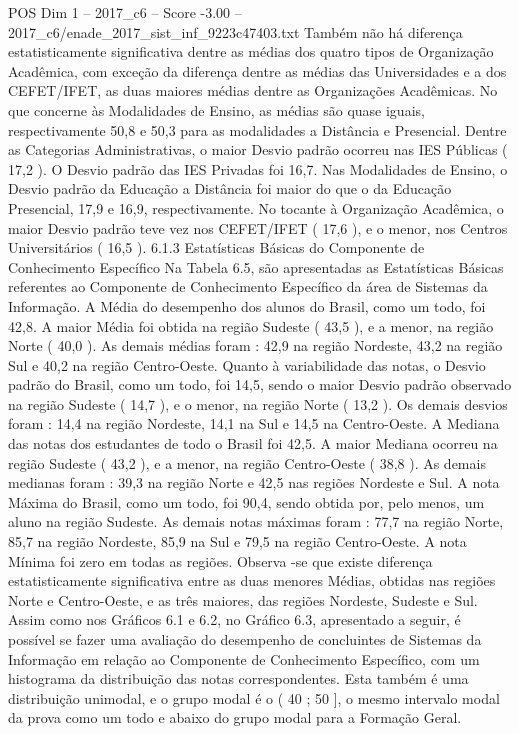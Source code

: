 \begin{textsample}{POS Dim 1 – 2017\_c6 – Score -3.00 – 2017\_c6/enade\_2017\_sist\_inf\_9223c47403.txt}
Também não há diferença estatisticamente significativa dentre as médias dos quatro tipos de Organização Acadêmica, com exceção da diferença dentre as médias das Universidades e a dos CEFET/IFET, as duas maiores médias dentre as Organizações Acadêmicas.
No que concerne às Modalidades de Ensino, as médias são quase iguais, respectivamente 50,8 e 50,3 para as modalidades a Distância e Presencial.
Dentre as Categorias Administrativas, o maior Desvio padrão ocorreu nas IES Públicas ( 17,2 ).
O Desvio padrão das IES Privadas foi 16,7.
Nas Modalidades de Ensino, o Desvio padrão da Educação a Distância foi maior do que o da Educação Presencial, 17,9 e 16,9, respectivamente.
No tocante à Organização Acadêmica, o maior Desvio padrão teve vez nos CEFET/IFET ( 17,6 ), e o menor, nos Centros Universitários ( 16,5 ). 6.1.3 Estatísticas Básicas do Componente de Conhecimento Específico Na Tabela 6.5, são apresentadas as Estatísticas Básicas referentes ao Componente de Conhecimento Específico da área de Sistemas da Informação.
A Média do desempenho dos alunos do Brasil, como um todo, foi 42,8.
A maior Média foi obtida na região Sudeste ( 43,5 ), e a menor, na região Norte ( 40,0 ).
As demais médias foram : 42,9 na região Nordeste, 43,2 na região Sul e 40,2 na região Centro-Oeste.
Quanto à variabilidade das notas, o Desvio padrão do Brasil, como um todo, foi 14,5, sendo o maior Desvio padrão observado na região Sudeste ( 14,7 ), e o menor, na região Norte ( 13,2 ).
Os demais desvios foram : 14,4 na região Nordeste, 14,1 na Sul e 14,5 na Centro-Oeste.
A Mediana das notas dos estudantes de todo o Brasil foi 42,5.
A maior Mediana ocorreu na região Sudeste ( 43,2 ), e a menor, na região Centro-Oeste ( 38,8 ).
As demais medianas foram : 39,3 na região Norte e 42,5 nas regiões Nordeste e Sul.
A nota Máxima do Brasil, como um todo, foi 90,4, sendo obtida por, pelo menos, um aluno na região Sudeste.
As demais notas máximas foram : 77,7 na região Norte, 85,7 na região Nordeste, 85,9 na Sul e 79,5 na região Centro-Oeste.
A nota Mínima foi zero em todas as regiões.
Observa -se que existe diferença estatisticamente significativa entre as duas menores Médias, obtidas nas regiões Norte e Centro-Oeste, e as três maiores, das regiões Nordeste, Sudeste e Sul.
Assim como nos Gráficos 6.1 e 6.2, no Gráfico 6.3, apresentado a seguir, é possível se fazer uma avaliação do desempenho de concluintes de Sistemas da Informação em relação ao Componente de Conhecimento Específico, com um histograma da distribuição das notas correspondentes.
Esta também é uma distribuição unimodal, e o grupo modal é o ( 40 ; 50 ], o mesmo intervalo modal da prova como um todo e abaixo do grupo modal para a Formação Geral.

\end{textsample}
